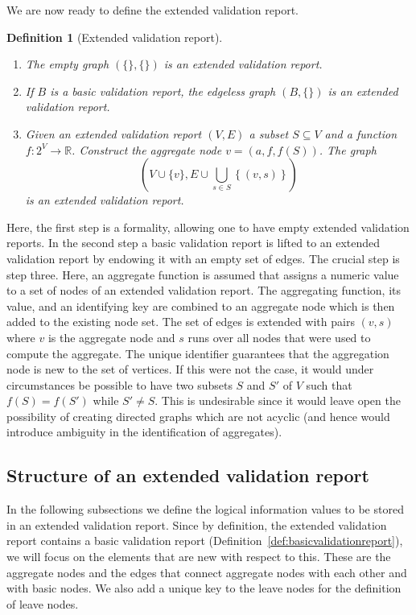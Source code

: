 \documentclass[a4paper, 11pt,titlepage]{article}
\newtheorem{definition}{Definition}
\begin{document}
We are now ready to define the extended validation report.
%
\begin{definition}[Extended validation report]\leavevmode
\label{def:extvalrep}
\begin{enumerate}
\item The empty graph $(\{\},\{\})$ is an extended validation report.
\item If $B$ is a basic validation report, the edgeless graph $(B, \{\})$ is an
extended validation report.
\item Given an extended validation report $(V,E)$  a subset $S\subseteq V$ and
a function $f:2^V\to\mathbb{R}$. Construct the aggregate node $v=(a,f,f(S))$.
The graph
\begin{displaymath}
\left(
V\cup \{v\}, E\cup \bigcup_{s\in S}\left\{( v, s )\right\}
\right)
\end{displaymath}
is an extended validation report.
\end{enumerate}
\end{definition}
Here, the first step is a formality, allowing one to have empty extended
validation reports. In the second step a basic validation report is lifted to
an extended validation report by endowing it with an empty set of edges. The
crucial step is step three. Here, an aggregate function is assumed that assigns
a numeric value to a set of nodes of an extended validation report.  The
aggregating function, its value, and an identifying key are combined to an
aggregate node which is then added to the existing node set. The set of edges
is extended with pairs $(v,s)$ where $v$ is the aggregate node and $s$ runs
over all nodes that were used to compute the aggregate.  The unique identifier
guarantees that the aggregation node is new to the set of vertices. If this
were not the case, it would under circumstances be possible to have two subsets
$S$ and $S'$ of $V$ such that $f(S)=f(S')$ while $S'\not=S$. This is
undesirable since it would leave open the possibility of creating directed
graphs which are not acyclic (and hence would introduce ambiguity in the
identification of aggregates).






\subsection{Structure of an extended validation report}
\label{sect:extendedreport}
In the following subsections we define the logical information values to be
stored in an extended validation report. Since by definition, the extended
validation report contains a basic validation report
(Definition~\ref{def:basicvalidationreport}), we will focus on the elements
that are new with respect to this.  These are the aggregate nodes and the edges
that connect aggregate nodes with each other and with basic nodes. We also add
a unique key to the leave nodes for the definition of leave nodes.
\end{document}
